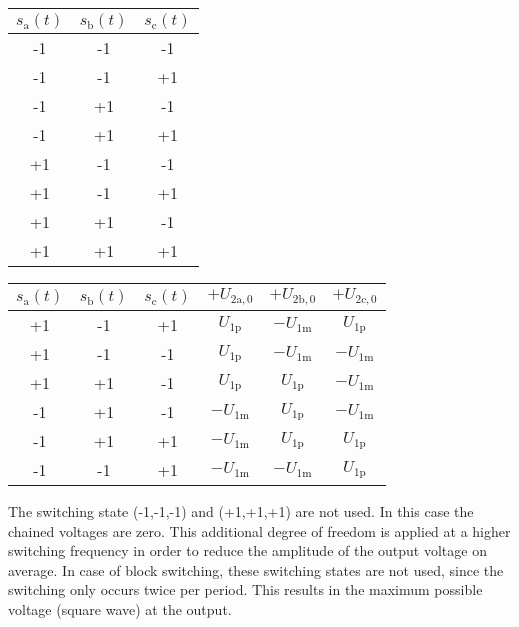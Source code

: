 \begin{solutionblock}
    \begin{minipage}{0.3\textwidth}
            \begin{tabular}{|c|c|c|} %
            \hline
            \bfseries $s_\mathrm{a}(t)$ & \bfseries $s_\mathrm{b}(t)$ & \bfseries $s_\mathrm{c}(t)$ \\ \hline
            -1 & -1 & -1 \\ \hline
            -1 & -1 & +1 \\ \hline
            -1 & +1 & -1 \\ \hline
            -1 & +1 & +1 \\ \hline
            +1 & -1 & -1 \\ \hline
            +1 & -1 & +1 \\ \hline
            +1 & +1 & -1 \\ \hline
            +1 & +1 & +1 \\ \hline
        \end{tabular}
        \noindent
        \label{stable:ex07_Task2_Switchingstates}    
    \end{minipage}
    \hfill
    \begin{minipage}{0.55\textwidth} 
        \begin{tabular}{|c|c|c|c|c|c|} %
            \hline
            \bfseries $s_\mathrm{a}(t)$ & \bfseries $s_\mathrm{b}(t)$ & \bfseries $s_\mathrm{c}(t)$
            & \bfseries $+U_\mathrm{2a,0}$ & \bfseries $+U_\mathrm{2b,0}$ & \bfseries $+U_\mathrm{2c,0}$ \\ \hline
            +1 & -1 & +1 & $U_\mathrm{1p}$ & $-U_\mathrm{1m}$ & $U_\mathrm{1p}$ \\ \hline
            +1 & -1 & -1 & $U_\mathrm{1p}$ & $-U_\mathrm{1m}$ & $-U_\mathrm{1m}$ \\ \hline
            +1 & +1 & -1 & $U_\mathrm{1p}$ & $U_\mathrm{1p}$ & $-U_\mathrm{1m}$ \\ \hline
            -1 & +1 & -1 & $-U_\mathrm{1m}$ & $U_\mathrm{1p}$ & $-U_\mathrm{1m}$ \\ \hline
            -1 & +1 & +1 & $-U_\mathrm{1m}$ & $U_\mathrm{1p}$ & $U_\mathrm{1p}$ \\ \hline
            -1 & -1 & +1 & $-U_\mathrm{1m}$ & $-U_\mathrm{1m}$ & $U_\mathrm{1p}$ \\ \hline
        \end{tabular}
        \label{stable:ex07_Task2_UsedSwitchingStates}    
    \end{minipage}
    \bigskip
    \FloatBarrier
    The switching state (-1,-1,-1) and (+1,+1,+1) are not used. In this case the chained voltages are zero. 
    This additional degree of freedom is applied at a higher switching frequency in order to reduce the amplitude of the
    output voltage on average. In case of block switching, these switching states are not used, since
    the switching only occurs twice per period. This results in the maximum possible voltage (square wave) at the output.
\end{solutionblock}

